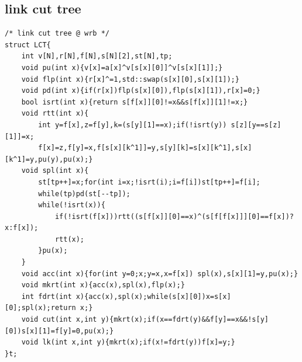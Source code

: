 \documentclass[UTF8, a4paper, titlepage, twoside]{ctexart}
\begin{document}
\subsection{ link cut tree }
\begin{lstlisting}[style=cpp]
/* link cut tree @ wrb */
struct LCT{
    int v[N],r[N],f[N],s[N][2],st[N],tp;
    void pu(int x){v[x]=a[x]^v[s[x][0]]^v[s[x][1]];}
    void flp(int x){r[x]^=1,std::swap(s[x][0],s[x][1]);}
    void pd(int x){if(r[x])flp(s[x][0]),flp(s[x][1]),r[x]=0;}
    bool isrt(int x){return s[f[x]][0]!=x&&s[f[x]][1]!=x;}
    void rtt(int x){
        int y=f[x],z=f[y],k=(s[y][1]==x);if(!isrt(y)) s[z][y==s[z][1]]=x;
        f[x]=z,f[y]=x,f[s[x][k^1]]=y,s[y][k]=s[x][k^1],s[x][k^1]=y,pu(y),pu(x);}
    void spl(int x){
        st[tp++]=x;for(int i=x;!isrt(i);i=f[i])st[tp++]=f[i];
        while(tp)pd(st[--tp]);
        while(!isrt(x)){
            if(!isrt(f[x]))rtt((s[f[x]][0]==x)^(s[f[f[x]]][0]==f[x])?x:f[x]);
            rtt(x);
        }pu(x);
    }
    void acc(int x){for(int y=0;x;y=x,x=f[x]) spl(x),s[x][1]=y,pu(x);}
    void mkrt(int x){acc(x),spl(x),flp(x);}
    int fdrt(int x){acc(x),spl(x);while(s[x][0])x=s[x][0];spl(x);return x;}
    void cut(int x,int y){mkrt(x);if(x==fdrt(y)&&f[y]==x&&!s[y][0])s[x][1]=f[y]=0,pu(x);}
    void lk(int x,int y){mkrt(x);if(x!=fdrt(y))f[x]=y;}
}t;
\end{lstlisting}
\end{document}
